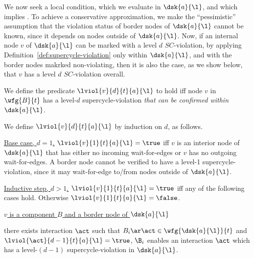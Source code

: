




\clearpage




We now seek a local condition, which we evaluate in $\dsk{a}{\l}$, and which implies \GAO.
To achieve a conservative approximation, we make the ``pessimistic'' assumption that the violation status of border
nodes of $\dsk{a}{\l}$ cannot be known, since it depends on nodes outside of $\dsk{a}{\l}$.
Now, if an internal node $v$ of $\dsk{a}{\l}$ can be marked with a level $d$ $SC$-violation, by applying 
Definition~\ref{def:supercycle-violation} only within $\dsk{a}{\l}$, and with the border nodes makrked non-violating,
then it is also the case, as we show below, that $v$ has a level $d$ $SC$-violation overall.




We define the predicate $\lviol{v}{d}{t}{a}{\l}$ to hold iff node $v$ in $\wfg{B}{t}$ has a level-$d$ supercycle-violation
\emph{that can be confirmed within $\dsk{a}{\l}$}.


\label{def:supercycle.violation.local}
We define  $\lviol{v}{d}{t}{a}{\l}$ by induction on $d$, as follows.

\noindent
\ul{Base case, $d=1$.} $\lviol{v}{1}{t}{a}{\l} = \true$  iff $v$ is an interior node of $\dsk{a}{\l}$ that has either
no incoming wait-for-edges or $v$ has no outgoing wait-for-edges. A border node cannot be verified to have a level-1
supercycle-violation, since it may wait-for-edge to/from nodes outside of $\dsk{a}{\l}$.

\noindent
\ul{Inductive step, $d > 1$.} $\lviol{v}{1}{t}{a}{\l} = \true$ iff any of the following cases hold. Otherwise 
$\lviol{v}{1}{t}{a}{\l} = \false$.


\be

\item \ul{$v$ is a component $B$ and a border node of $\dsk{a}{\l}$}
   \be

   \item there exists interaction $\act$ such that $B_i \ar \act \in \wfg{\dsk{a}{\l}}{t}$ and $\lviol{\act}{d-1}{t}{a}{\l} = \true$,
         \ie $\B_i$ enables an interaction $\act$ which has a level-$(d-1)$ supercycle-violation in $\dsk{a}{\l}$. 

